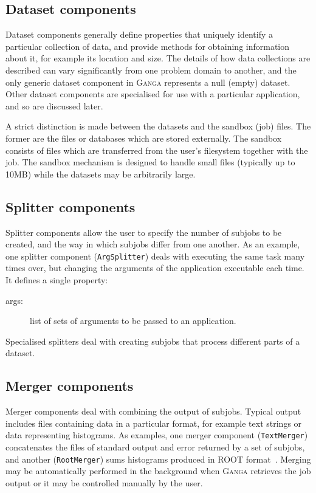 \documentclass{elsart}
\def\ganga {\textsc{Ganga}\xspace}
\newcommand{\code}[1]{\texttt{#1}}
\begin{document}
\begin{linenumbers}
\subsection{Dataset components}
Dataset components generally define properties that uniquely identify a
particular collection of data, and provide methods for obtaining information
about it, for example its location and size. The details of how data
collections are described can vary significantly from one problem domain to
another, and the only generic dataset component in \ganga represents a null
(empty) dataset.  Other dataset components are specialised for use with a
particular application, and so are discussed later.

A strict distinction is made between the datasets and the sandbox (job)
files.  The former are the files or databases which are stored
externally.  The sandbox consists of files which are transferred from
the user's filesystem together with the job.  The sandbox mechanism is
designed to handle small files (typically up to 10MB) while the
datasets may be arbitrarily large.

\subsection{Splitter components}
Splitter components allow the user to specify the number of subjobs to be
created, and the way in which subjobs differ from one another. As an example,
one splitter component (\code{ArgSplitter}) deals with executing the same task
many times over, but changing the arguments of the application executable each
time. It defines a single property:
\begin{description}
\item[args:] list of sets of arguments to be passed to an application.
\end{description}
Specialised splitters deal with creating subjobs that process different parts
of a dataset.

\subsection{Merger components}
Merger components deal with combining the output of
subjobs. Typical output includes files containing data in a
particular format, for example text strings or data representing
histograms. As examples, one merger component (\code{TextMerger})
concatenates the files of standard output and error returned by a set
of subjobs, and another (\code{RootMerger}) sums histograms produced
in ROOT format~\cite{ROOT}. Merging may be automatically performed in
the background when \ganga retrieves the job output or it may be
controlled manually by the user.


\end{linenumbers}
\end{document}
